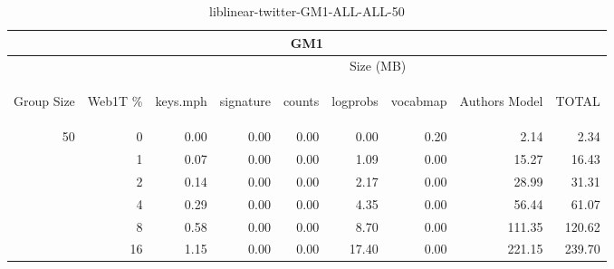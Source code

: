 \begin{center}
\begin{table}[htbp] 
 \begin{center}
\begin{tabular}{ | r | r | r | r | r | r | r | r | r |}
\hline
\multicolumn{9}{|c|}{GM1}\\
\hline
 & & \multicolumn{7}{|c|}{Size (MB)}\\ \cline{3-9}
\begin{sideways}Group Size\end{sideways} & \begin{sideways}Web1T \% \end{sideways} & \begin{sideways}keys.mph\end{sideways} & \begin{sideways}signature\end{sideways} & \begin{sideways}counts\end{sideways} & \begin{sideways}logprobs\end{sideways} & \begin{sideways}vocabmap\end{sideways} & \begin{sideways}Authors Model \end{sideways} & \begin{sideways}TOTAL\end{sideways}\\
\hline
\multirow{5}{*}{50}
 & 0 & 0.00 & 0.00 & 0.00 & 0.00 & 0.20 & 2.14 & 2.34\\ \cline{2-9}
 & 1 & 0.07 & 0.00 & 0.00 & 1.09 & 0.00 & 15.27 & 16.43\\ \cline{2-9}
 & 2 & 0.14 & 0.00 & 0.00 & 2.17 & 0.00 & 28.99 & 31.31\\ \cline{2-9}
 & 4 & 0.29 & 0.00 & 0.00 & 4.35 & 0.00 & 56.44 & 61.07\\ \cline{2-9}
 & 8 & 0.58 & 0.00 & 0.00 & 8.70 & 0.00 & 111.35 & 120.62\\ \cline{2-9}
 & 16 & 1.15 & 0.00 & 0.00 & 17.40 & 0.00 & 221.15 & 239.70\\ \cline{2-9}
\hline
\end{tabular}
\caption{liblinear-twitter-GM1-ALL-ALL-50}
\label{table:liblinear-twitter-GM1-ALL-ALL-50}
\end{center}
 \end{table}
\end{center}

